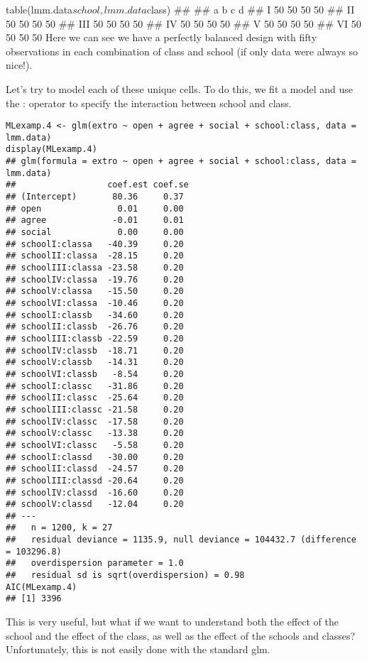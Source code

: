 table(lmm.data$school, lmm.data$class)
##      
##        a  b  c  d
##   I   50 50 50 50
##   II  50 50 50 50
##   III 50 50 50 50
##   IV  50 50 50 50
##   V   50 50 50 50
##   VI  50 50 50 50
Here we can see we have a perfectly balanced design with fifty observations in each combination of class and school (if only data were always so nice!).

Let's try to model each of these unique cells. To do this, we fit a model and use the : operator to specify the interaction between school and class.
\begin{framed}
	\begin{verbatim}
MLexamp.4 <- glm(extro ~ open + agree + social + school:class, data = lmm.data)
display(MLexamp.4)
## glm(formula = extro ~ open + agree + social + school:class, data = lmm.data)
##                  coef.est coef.se
## (Intercept)       80.36     0.37 
## open               0.01     0.00 
## agree             -0.01     0.01 
## social             0.00     0.00 
## schoolI:classa   -40.39     0.20 
## schoolII:classa  -28.15     0.20 
## schoolIII:classa -23.58     0.20 
## schoolIV:classa  -19.76     0.20 
## schoolV:classa   -15.50     0.20 
## schoolVI:classa  -10.46     0.20 
## schoolI:classb   -34.60     0.20 
## schoolII:classb  -26.76     0.20 
## schoolIII:classb -22.59     0.20 
## schoolIV:classb  -18.71     0.20 
## schoolV:classb   -14.31     0.20 
## schoolVI:classb   -8.54     0.20 
## schoolI:classc   -31.86     0.20 
## schoolII:classc  -25.64     0.20 
## schoolIII:classc -21.58     0.20 
## schoolIV:classc  -17.58     0.20 
## schoolV:classc   -13.38     0.20 
## schoolVI:classc   -5.58     0.20 
## schoolI:classd   -30.00     0.20 
## schoolII:classd  -24.57     0.20 
## schoolIII:classd -20.64     0.20 
## schoolIV:classd  -16.60     0.20 
## schoolV:classd   -12.04     0.20 
## ---
##   n = 1200, k = 27
##   residual deviance = 1135.9, null deviance = 104432.7 (difference = 103296.8)
##   overdispersion parameter = 1.0
##   residual sd is sqrt(overdispersion) = 0.98
AIC(MLexamp.4)
## [1] 3396
\end{verbatim}
\end{framed}
This is very useful, but what if we want to understand both the effect of the school and the effect of the class, as well as the effect of the schools and classes? Unfortunately, this is not easily done with the standard glm.

